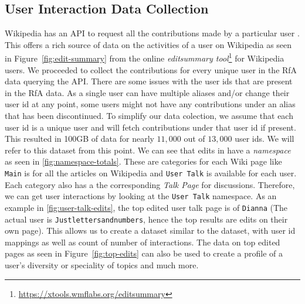 \subsection{User Interaction Data Collection}
\label{sec:user-contrib}
Wikipedia has an API to request all the contributions made by a particular user \cite{wiki:Usercontribs}. This offers a rich source of data on the activities of a user on Wikipedia as seen in Figure~\ref{fig:edit-summary} from the online \textit{editsummary tool}\footnote{\url{https://xtools.wmflabs.org/editsummary}} for Wikipedia users. We proceeded to collect the contributions for every unique user in the RfA data querying the API. There are some issues with the user ids that are present in the RfA data. As a single user can have multiple aliases and/or change their user id at any point, some users might not have any contributions under an alias that has been discontinued. To simplify our data colection, we assume that each user id is a unique user and will fetch contributions under that user id if present. This resulted in 100GB of data for nearly $11,000$ out of $13,000$ user ids. We will refer to this dataset \usercontrib from this point.
\smallskip
We can see that edits in \usercontrib have a \textit{namespace} as seen in \ref{fig:namespace-totals}. These are categories for each Wiki page like \texttt{Main} is for all the articles on Wikipedia and \texttt{User Talk} is available for each user. Each category also has a the corresponding \textit{Talk Page} for discussions. Therefore, we can get user interactions by looking at the \texttt{User Talk} namespace. As an example in \ref{fig:user-talk-edits}, the top edited user talk page is of \texttt{Dianna} (The actual user is \texttt{Justlettersandnumbers}, hence the top results are edits on their own page). This allows us to create a dataset similar to  the \wikitalk  dataset, with user id mappings as well as count of number of interactions. The data on top edited pages as seen in Figure~\ref{fig:top-edits} can also be used to create a profile of a user's diversity or speciality of topics and much more.

